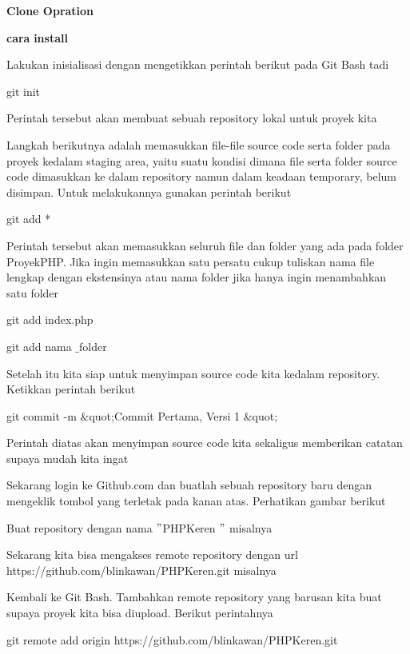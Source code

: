 
\sloppy
{\fontsize{16pt}{16pt}\selectfont \textbf{Clone Opration} \\} \par
\noindent 
\textbf{cara}\textbf{ install} \par
\noindent 
Lakukan inisialisasi dengan mengetikkan perintah berikut pada Git Bash tadi \par
\noindent 
git init \par
\noindent 
Perintah tersebut akan membuat sebuah repository lokal untuk proyek kita \par
\noindent 
Langkah berikutnya adalah memasukkan file-file source code serta folder pada proyek kedalam staging area, yaitu suatu kondisi dimana file serta folder source code dimasukkan ke dalam repository namun dalam keadaan temporary, belum disimpan. Untuk melakukannya gunakan perintah berikut \par
\noindent 
git add * \par
\noindent 
Perintah tersebut akan memasukkan seluruh file dan folder yang ada pada folder ProyekPHP. Jika ingin memasukkan satu persatu cukup tuliskan nama file lengkap dengan ekstensinya atau nama folder jika hanya ingin menambahkan satu folder \par
\noindent 
git add index.php \par
\noindent 
git add nama $  \_  $folder \par
\noindent 
Setelah itu kita siap untuk menyimpan source code kita kedalam repository. Ketikkan perintah berikut \par
\noindent 
git commit -m  $  \&  $quot;Commit Pertama, Versi 1 $  \&  $quot; \par
\noindent 
Perintah diatas akan menyimpan source code kita sekaligus memberikan catatan supaya mudah kita ingat \par
\noindent 
Sekarang login ke Github.com dan buatlah sebuah repository baru dengan mengeklik tombol yang terletak pada kanan atas. Perhatikan gambar berikut \par
\noindent 
Buat repository dengan nama  $ " $PHPKeren $ " $ misalnya \par
\noindent 
Sekarang kita bisa mengakses remote repository dengan url https://github.com/blinkawan/PHPKeren.git misalnya \par
\noindent 
Kembali ke Git Bash. Tambahkan remote repository yang barusan kita buat supaya proyek kita bisa diupload. Berikut perintahnya \par
\noindent 
git remote add origin https://github.com/blinkawan/PHPKeren.git \par
